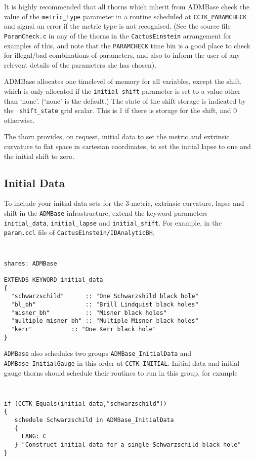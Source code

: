 \documentclass{article}
\begin{document}
It is highly recommended that all thorns which inherit from ADMBase
check the value of the {\tt metric\_type} parameter in a routine
scheduled at {\tt CCTK\_PARAMCHECK} and signal an error if the metric
type is not recognised. (See the source file {\tt ParamCheck.c} in any
of the thorns in the {\tt CactusEinstein} arrangement for examples of
this, and note that the {\tt PARAMCHECK} time bin is a good place to 
check for illegal/bad combinations of parameters, and also to inform
the user of any relevent details of the parameters she has chosen).

ADMBase allocates one timelevel of memory for all variables, except
the shift, which is only allocated if the {\tt initial\_shift}
parameter is set to a value other than `none'.  (`none' is the
default.)  The state of the shift storage is indicated by the {\tt
shift\_state} grid scalar.  This is 1 if there is storage for the
shift, and 0 otherwise.

The thorn provides, on request, initial data to set the metric and
extrinsic curvature to flat space in cartesian coordinates, to set the
initial lapse to one and the initial shift to zero.


\subsection{Initial Data} 

To include your initial data sets for the 3-metric, extrinsic
curvature, lapse and shift in the {\tt ADMBase} infrastructure, extend
the keyword parameters {\tt initial\_data}, {\tt initial\_lapse} and
{\tt initial\_shift}. For example, in the {\tt param.ccl} file of {\tt CactusEinstein/IDAnalyticBH},

{\tt
\begin{verbatim}
shares: ADMBase

EXTENDS KEYWORD initial_data 
{
  "schwarzschild"      :: "One Schwarzshild black hole"
  "bl_bh"              :: "Brill Lindquist black holes"
  "misner_bh"          :: "Misner black holes"
  "multiple_misner_bh" :: "Multiple Misner black holes"
  "kerr"	       :: "One Kerr black hole"	
} 
\end{verbatim}
}

{\tt ADMBase} also schedules two groups {\tt ADMBase\_InitialData} and
{\tt ADMBase\_InitialGauge} in this order at {\tt CCTK\_INITIAL}.
Initial data and initial gauge thorns should schedule their routines
to run in this group, for example

{\tt
\begin{verbatim}
if (CCTK_Equals(initial_data,"schwarzschild")) 
{ 	
   schedule Schwarzschild in ADMBase_InitialData
   {
     LANG: C
   } "Construct initial data for a single Schwarzschild black hole"
}
\end{verbatim}
}
\end{document}
